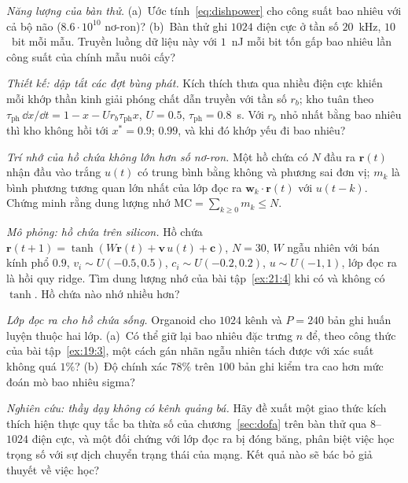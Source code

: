 \begin{exercise}[\lvlA]
\label{ex:21:2}
\emph{Năng lượng của bàn thử.} (a)~Ước tính~\eqref{eq:dishpower} cho công suất bao nhiêu với cả bộ não ($8.6\cdot10^{10}$ nơ-ron)? (b)~Bàn thử ghi $1024$ điện cực ở tần số $20$~kHz, $10$~bit mỗi mẫu. Truyền luồng dữ liệu này với $1$~nJ mỗi bit tốn gấp bao nhiêu lần công suất của chính mẫu nuôi cấy?
\end{exercise}

\begin{exercise}[\lvlB]
\label{ex:21:3}
\emph{Thiết kế: dập tắt các đợt bùng phát.} Kích thích thưa qua nhiều điện cực khiến mỗi khớp thần kinh giải phóng chất dẫn truyền với tần số $r_b$; kho tuân theo $\tau_{\text{ph}}\,\dd x/\dd t=1-x-Ur_b\tau_{\text{ph}}x$, $U=0.5$, $\tau_{\text{ph}}=0.8$~s. Với $r_b$ nhỏ nhất bằng bao nhiêu thì kho không hồi tới $x^*=0.9$; $0.99$, và khi đó khớp yếu đi bao nhiêu?
\end{exercise}

\begin{exercise}[\lvlB]
\label{ex:21:4}
\emph{Trí nhớ của hồ chứa không lớn hơn số nơ-ron.} Một hồ chứa có $N$ đầu ra $\mathbf r(t)$ nhận đầu vào trắng $u(t)$ có trung bình bằng không và phương sai đơn vị; $m_k$ là bình phương tương quan lớn nhất của lớp đọc ra $\mathbf w_k\cdot\mathbf r(t)$ với $u(t-k)$. Chứng minh rằng dung lượng nhớ $\mathrm{MC}=\sum_{k\ge0}m_k\le N$.
\end{exercise}

\begin{exercise}[\lvlB]
\label{ex:21:5}
\emph{Mô phỏng: hồ chứa trên silicon.} Hồ chứa $\mathbf r(t+1)=\tanh(W\mathbf r(t)+\mathbf v\,u(t)+\mathbf c)$, $N=30$, $W$ ngẫu nhiên với bán kính phổ $0.9$, $v_i\sim U(-0.5,0.5)$, $c_i\sim U(-0.2,0.2)$, $u\sim U(-1,1)$, lớp đọc ra là hồi quy ridge. Tìm dung lượng nhớ của bài tập~\ref{ex:21:4} khi có và không có $\tanh$. Hồ chứa nào nhớ nhiều hơn?
\end{exercise}

\begin{exercise}[\lvlB]
\label{ex:21:6}
\emph{Lớp đọc ra cho hồ chứa sống.} Organoid cho $1024$ kênh và $P=240$ bản ghi huấn luyện thuộc hai lớp. (a)~Có thể giữ lại bao nhiêu đặc trưng $n$ để, theo công thức của bài tập~\ref{ex:19:3}, một cách gán nhãn ngẫu nhiên tách được với xác suất không quá $1\%$? (b)~Độ chính xác $78\%$ trên $100$ bản ghi kiểm tra cao hơn mức đoán mò bao nhiêu sigma?
\end{exercise}

\begin{exercise}[\lvlC]
\label{ex:21:7}
\emph{Nghiên cứu: thầy dạy không có kênh quảng bá.} Hãy đề xuất một giao thức kích thích hiện thực quy tắc ba thừa số của chương~\ref{sec:dofa} trên bàn thử qua $8$--$1024$ điện cực, và một đối chứng với lớp đọc ra bị đóng băng, phân biệt việc học trọng số với sự dịch chuyển trạng thái của mạng. Kết quả nào sẽ bác bỏ giả thuyết về việc học?
\end{exercise}
